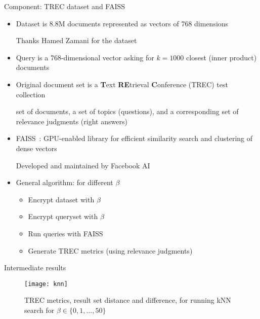 	\begin{frame}{Component: TREC dataset and FAISS~\cite{faiss}}

		\begin{itemize}
			\item<1->
				Dataset is 8.8M documents represented as vectors of 768 dimensions \\
				\begin{small}
					Thanks Hamed Zamani for the dataset
				\end{small}

			\item<2->
				Query is a 768-dimensional vector asking for $k = 1000$ closest (inner product) documents

			\item<3->
				Original document set is a \textbf{T}ext \textbf{RE}trieval \textbf{C}onference (TREC) test collection \\
				\begin{small}
					set of documents, a set of topics (questions), and a corresponding set of relevance judgments (right answers)
				\end{small}

			\item<4->
				FAISS~\cite{faiss}: GPU-enabled library for efficient similarity search and clustering of dense vectors
				\begin{small}
					Developed and maintained by Facebook AI
				\end{small}

			\item<5->
				General algorithm: for different $\beta$
				\begin{itemize}
					\item Encrypt dataset with $\beta$
					\item Encrypt queryset with $\beta$
					\item Run queries with FAISS
					\item Generate TREC metrics (using relevance judgments)
				\end{itemize}

		\end{itemize}

	\end{frame}

	\begin{frame}{Intermediate results}

		\begin{figure}[h]
			\centering
			\texttt{[image: knn]}
			\caption{TREC metrics, result set distance and difference, for running kNN search for $\beta \in \{ 0, 1, \ldots , 50 \} $}
		\end{figure}

	\end{frame}
